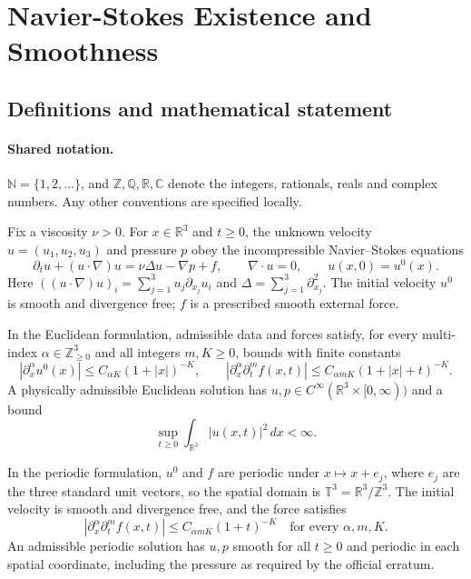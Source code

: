 \documentclass[11pt]{article}
\begin{document}
\section{Navier-Stokes Existence and Smoothness}\label{statement}

\subsection{Definitions and mathematical statement}

\paragraph{Shared notation.}$\mathbb N=\{1,2,\ldots\}$, and $\mathbb Z,\mathbb Q,\mathbb R,\mathbb C$ denote the integers, rationals, reals and complex numbers. Any other conventions are specified locally.


Fix a viscosity \(\nu>0\). For \(x\in\mathbb R^3\) and \(t\ge0\),
the unknown velocity \(u=(u_1,u_2,u_3)\) and pressure \(p\)
obey the incompressible Navier--Stokes equations
\[
 \partial_tu+(u\cdot\nabla)u=\nu\Delta u-\nabla p+f,
 \qquad \nabla\cdot u=0,
 \qquad u(x,0)=u^0(x).
\]
Here \(((u\cdot\nabla)u)_i=\sum_{j=1}^3u_j\partial_{x_j}u_i\)
and \(\Delta=\sum_{j=1}^3\partial_{x_j}^2\).
The initial velocity \(u^0\) is smooth and divergence free; \(f\)
is a prescribed smooth external force.

In the Euclidean formulation, admissible data and forces satisfy,
for every multi-index \(\alpha\in\mathbb Z_{\ge0}^3\) and all integers
\(m,K\ge0\), bounds with finite constants
\[
 |\partial_x^\alpha u^0(x)|\le C_{\alpha K}(1+|x|)^{-K},\qquad
 |\partial_x^\alpha\partial_t^mf(x,t)|
       \le C_{\alpha mK}(1+|x|+t)^{-K}.
\]
A physically admissible Euclidean solution has
\(u,p\in C^\infty(\mathbb R^3\times[0,\infty))\) and a bound
\[
                     \sup_{t\ge0}\int_{\mathbb R^3}|u(x,t)|^2\,dx<\infty.
\]

In the periodic formulation, \(u^0\) and \(f\) are periodic
under \(x\mapsto x+e_j\), where \(e_j\) are the three standard unit
vectors, so the spatial domain is \(\mathbb T^3=\mathbb R^3/\mathbb Z^3\).
The initial velocity is smooth and divergence free, and the force satisfies
\[
 |\partial_x^\alpha\partial_t^mf(x,t)|
       \le C_{\alpha mK}(1+t)^{-K}
                       \quad\text{for every }\alpha,m,K.
\]
An admissible periodic solution has \(u,p\) smooth for all \(t\ge0\)
and periodic in each spatial coordinate, including the pressure as required
by the official erratum.
\end{document}
